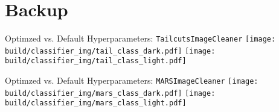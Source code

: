 



\section*{Backup}%
\label{sub:Backup}

\begin{frame}{Optimzed vs. Default Hyperparameters: \texttt{TailcutsImageCleaner}}
    {%
    \centering
    \texttt{[image: build/classifier\_img/tail\_class\_dark.pdf]}
    }
    {%
    \centering
    \texttt{[image: build/classifier\_img/tail\_class\_light.pdf]}
    }
\end{frame}

\begin{frame}{Optimzed vs. Default Hyperparameters: \texttt{MARSImageCleaner}}
    {%
    \centering
    \texttt{[image: build/classifier\_img/mars\_class\_dark.pdf]}
    }
    {%
    \centering
    \texttt{[image: build/classifier\_img/mars\_class\_light.pdf]}
    }
\end{frame}

